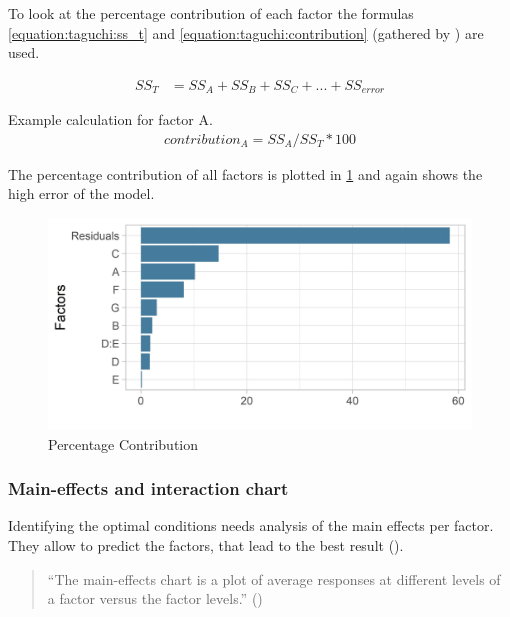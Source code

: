 To look at the percentage contribution of each factor the formulas \ref{equation:taguchi:ss_t} and \ref{equation:taguchi:contribution} (gathered by \cite{yang_design_2009}) are used.

\begin{equation} \label{equation:taguchi:ss_t}
	\begin{split}
		SS_T & = SS_A + SS_B + SS_C + ... + SS_{error}
	\end{split}
\end{equation}

Example calculation for factor A.
\begin{equation} \label{equation:taguchi:contribution}
	\begin{split}
		contribution_A = SS_A / SS_T * 100
	\end{split}
\end{equation}

The percentage contribution of all factors is plotted in \ref{figure:taguchi:percentage_contribution} and again shows the high error of the model. 
\begin{figure}[ht] 
	\label{figure:taguchi:percentage_contribution}
	\includegraphics[width=1\linewidth]{simulations/taguchi/plots/percentage_contribution}
	\caption{Percentage Contribution}
\end{figure}


\subsubsection{Main-effects and interaction chart}
Identifying the optimal conditions needs analysis of the main effects per factor. They allow to predict the factors, that lead to the best result (\cite{roy_primer_1990}).

\begin{quote}
	\begin{em}
		\enquote{The main-effects chart is a plot of average responses at different levels of a factor versus the factor levels.} (\cite{yang_design_2009})
	\end{em}
\end{quote}

